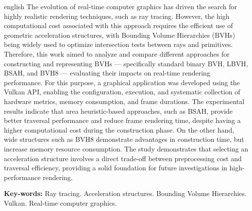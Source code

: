 \begin{resumo}[Abstract]    
\begin{otherlanguage*}{english}
\noindent 
The evolution of real-time computer graphics has driven the search for highly realistic rendering techniques, such as ray tracing. However, the high computational cost associated with this approach requires the efficient use of geometric acceleration structures, with Bounding Volume Hierarchies (BVHs) being widely used to optimize intersection tests between rays and primitives. Therefore, this work aimed to analyze and compare different approaches for constructing and representing BVHs --- specifically standard binary BVH, LBVH, BSAH, and BVH8 --- evaluating their impacts on real-time rendering performance. For this purpose, a graphical application was developed using the Vulkan API, enabling the configuration, execution, and systematic collection of hardware metrics, memory consumption, and frame durations. The experimental results indicate that area heuristic-based approaches, such as BSAH, provide better traversal performance and reduce frame rendering time, despite having a higher computational cost during the construction phase. On the other hand, wide structures such as BVH8 demonstrate advantages in construction time, but increase memory resource consumption. The study demonstrates that selecting an acceleration structure involves a direct trade-off between preprocessing cost and traversal efficiency, providing a solid foundation for future investigations in high-performance rendering.

\vspace{0.2cm}
\noindent\textbf{Key-words:} Ray tracing. Acceleration structures. Bounding Volume Hierarchies. Vulkan. Real-time computer graphics.
\end{otherlanguage*}
\end{resumo}